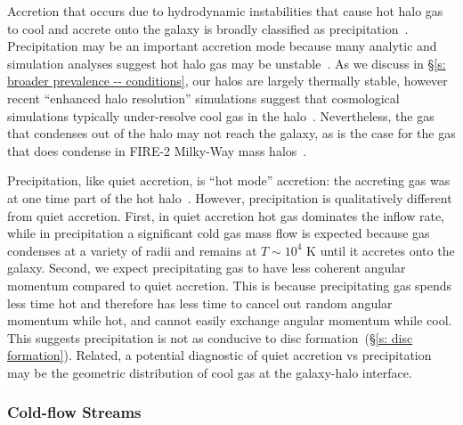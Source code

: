 \documentclass[fleqn,usenatbib]{mnras}
\begin{document}
Accretion that occurs due to hydrodynamic instabilities that cause hot halo gas to cool and accrete onto the galaxy is broadly classified as precipitation~\citep[e.g.][]{Sharma2012, Voit2015a, Voit2018, Voit2021}.
Precipitation may be an important accretion mode because many analytic and simulation analyses suggest hot halo gas may be unstable~\citep[e.g.][]{Balbus1989, Maller2004, McCourt2012, McCourt2016, Joung2012a, Li2014, Armillotta2016, McNamara2016, Schneider2018, Liang2018a, Gronke2019, Gronke2019a, Li2019, Fielding2020}.
As we discuss in \S\ref{s: broader prevalence -- conditions}, our halos are largely thermally stable, however recent ``enhanced halo resolution'' simulations suggest that cosmological simulations typically under-resolve cool gas in the halo~\citep{VandeVoort2018, Peeples2019a, Hummels2019, Suresh2019}.
Nevertheless, the gas that condenses out of the halo may not reach the galaxy, as is the case for the gas that does condense in FIRE-2 Milky-Way mass halos~\citep{Esmerian2020}.

Precipitation, like quiet accretion, is ``hot mode'' accretion: the accreting gas was at one time part of the hot halo~\citep[e.g.][]{Nelson2013}.
However, precipitation is qualitatively different from quiet accretion.
First, in quiet accretion hot gas dominates the inflow rate, while in precipitation a significant cold gas mass flow is expected because gas condenses at a variety of radii and remains at $T\sim 10^4$ K until it accretes onto the galaxy.
Second, we expect precipitating gas to have less coherent angular momentum compared to quiet accretion.
This is because precipitating gas spends less time hot and therefore has less time to cancel out random angular momentum while hot, and cannot easily exchange angular momentum while cool.
This suggests precipitation is not as conducive to disc formation~(\S\ref{s: disc formation}).
Related, a potential diagnostic of quiet accretion vs precipitation may be the geometric distribution of cool gas at the galaxy-halo interface.

\subsubsection{Cold-flow Streams}
\label{s: modes -- cold}
\end{document}
